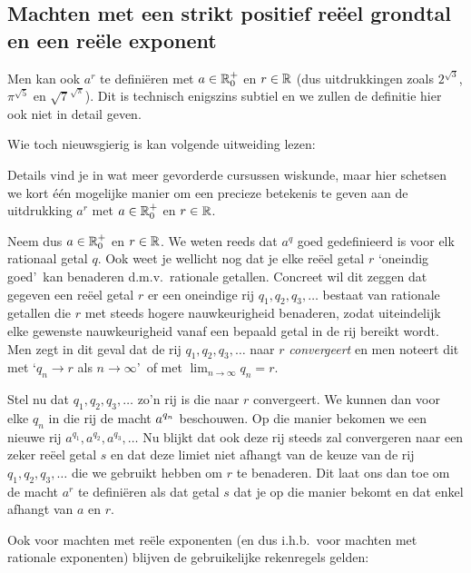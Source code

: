 \documentclass{ximera}
\begin{document}
\subsection*{Machten met een strikt positief re\"eel grondtal en een re\"ele exponent}\label{machten-r}
Men kan ook $a^r$ te definiëren met $a\in\mathbb{R}_0^+$
en $r\in\mathbb{R}$ (dus uitdrukkingen zoals $2^{\sqrt{3}}$, $\pi^{\sqrt{5}}$ en $\sqrt{7}^{\sqrt{\pi}}$). Dit is technisch enigszins subtiel en we zullen de definitie hier
ook niet in detail geven. 

Wie toch nieuwsgierig is kan volgende uitweiding lezen:


\begin{uitweiding}
	\begin{expandable}
Details vind je in wat meer gevorderde cursussen wiskunde, maar hier schetsen we kort \'{e}\'{e}n mogelijke manier om een precieze betekenis te geven
aan de uitdrukking $a^r$ met $a\in\mathbb{R}_0^+$ en $r\in\mathbb{R}$.

Neem dus $a\in\mathbb{R}_0^+$ en $r\in\mathbb{R}$. We weten reeds dat $a^q$
goed gedefinieerd is voor elk rationaal getal $q$. Ook weet je
wellicht nog dat je elke re\"eel getal $r$ \lq oneindig goed\rq\
kan benaderen d.m.v.~rationale getallen. Concreet wil dit zeggen
dat gegeven een re\"eel getal $r$ er een oneindige rij
$q_1,q_2,q_3,\ldots$ bestaat van rationale getallen die $r$ met
steeds hogere nauwkeurigheid benaderen, zodat uiteindelijk elke
gewenste nauwkeurigheid vanaf een bepaald getal in de rij bereikt
wordt. Men zegt in dit geval dat de rij $q_1,q_2,q_3,\ldots$ naar
$r$ \emph{convergeert} en men noteert dit met \lq $q_n\to r$ als
$n\to\infty$\rq\ of met $\lim_{n\to\infty}q_n=r$.

Stel nu dat $q_1,q_2,q_3,\ldots$ zo'n rij is die naar $r$
convergeert. We kunnen dan voor elke $q_n$ in die rij de macht
$\displaystyle a^{q_n}$ beschouwen. Op die manier bekomen we een nieuwe rij
$a^{q_1},a^{q_2},a^{q_3},\ldots$ 	
Nu blijkt dat ook deze rij steeds
zal convergeren naar een zeker re\"eel getal $s$ en dat deze
limiet niet afhangt van de keuze van de rij $q_1,q_2,q_3,\ldots$
die we gebruikt hebben  om $r$ te benaderen. Dit laat ons dan toe
om de macht $a^r$ te defini\"eren als dat getal $s$ dat je op die
manier bekomt en dat enkel afhangt van $a$ en $r$.
\end{expandable}
\end{uitweiding}

Ook voor machten met re\"ele exponenten (en dus i.h.b.~voor
machten met rationale exponenten) blijven de gebruikelijke
rekenregels  gelden:
\end{document}
